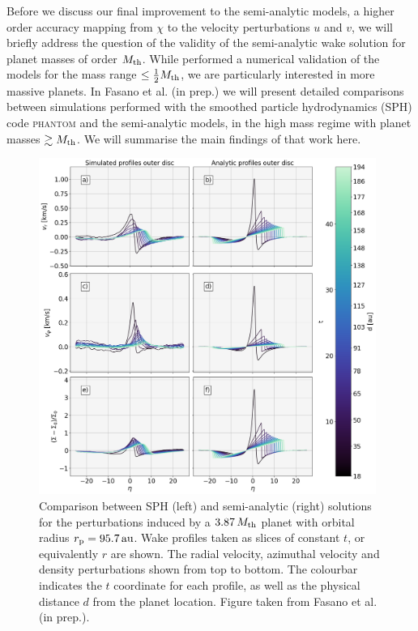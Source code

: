 \vspace{0.2cm}

Before we discuss our final improvement to the semi-analytic models, a higher order accuracy mapping from $\chi$ to the velocity perturbations $u$ and $v$, we will briefly address the question of the validity of the semi-analytic wake solution for planet masses of order $M_{\rm th}$.
While \citet{cimerman2021} performed a numerical validation of the models for the mass range $\le \frac{1}{2} M_{\rm th}$, we are particularly interested in more massive planets.
In Fasano et al. (in prep.) we will present detailed comparisons between simulations performed with the smoothed particle hydrodynamics (SPH) code \textsc{phantom} \citep{price2018} and the semi-analytic models, in the high mass regime with planet masses $\gtrsim M_{\rm th}$.
We will summarise the main findings of that work here.

\begin{figure}[H]
    \centering
    \includegraphics[width = 0.98\textwidth]{figures/comp_as_prof_out_high.png}
    \caption{Comparison between SPH (left) and semi-analytic (right) solutions for the perturbations induced by a $3.87 \, M_{\rm th}$ planet with orbital radius $r_{\rm p}=95.7 \, \mathrm{au}$. Wake profiles taken as slices of constant $t$, or equivalently $r$ are shown. The radial velocity, azimuthal velocity and density perturbations shown from top to bottom. The colourbar indicates the $t$ coordinate for each profile, as well as the physical distance $d$ from the planet location. Figure taken from Fasano et al. (in prep.).}
    \label{fig:profile_comparison}
\end{figure}

